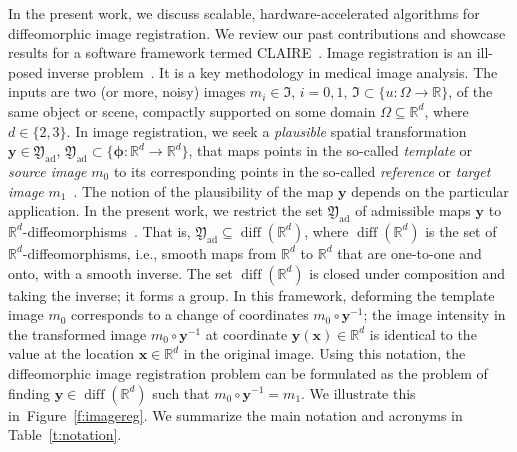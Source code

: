 \documentclass[11pt]{amsart}
\newcommand{\figref}[1]{Figure~\ref{#1}}
\newcommand{\tabref}[1]{Table~\ref{#1}}
\newcommand\fs[1]{\ensuremath{\mathfrak{#1}}}
\renewcommand{\vec}[1]{\ensuremath{\boldsymbol{#1}}}
\begin{document}
In the present work, we discuss scalable, hardware-accelerated algorithms for diffeomorphic image registration. We review our past contributions and showcase results for a software framework termed CLAIRE~\cite{Mang:2019a,claireweb,Brunn:2021b}. Image registration is an ill-posed inverse problem~\cite{Fischer:2008a}. It is a key methodology in medical image analysis. The inputs are two (or more, noisy) images $m_i \in \fs{I}$, $i = 0,1$, $\fs{I} \subset \{u : \Omega \to \mathbb{R}\}$, of the same object or scene, compactly supported on some domain $\Omega \subseteq \mathbb{R}^d$, where $d \in \{2,3\}$. In image registration, we seek a \emph{plausible} spatial transformation $\vec{y} \in \fs{Y}_{\text{ad}}$, $\fs{Y}_{\text{ad}} \subset \{\vec{\phi} : \mathbb{R}^d \to \mathbb{R}^d\}$, that maps points in the so-called \emph{template} or \emph{source image} $m_0$ to its corresponding points in the so-called \emph{reference} or \emph{target image} $m_1$~\cite{Modersitzki:2004a,Modersitzki:2009a,Fischer:2008a}. The notion of the plausibility of the map $\vec{y}$ depends on the particular application. In the present work, we restrict the set $\fs{Y}_{\text{ad}}$ of admissible maps $\vec{y}$ to $\mathbb{R}^d$-diffeomorphisms~\cite{Younes:2019a}. That is, $\fs{Y}_{\text{ad}} \subseteq \operatorname{diff}(\mathbb{R}^d)$, where $\operatorname{diff}(\mathbb{R}^d)$ is the  set of $\mathbb{R}^d$-diffeomorphisms, i.e., smooth maps from $\mathbb{R}^d$ to $\mathbb{R}^d$ that are one-to-one and onto, with a smooth inverse. The set $\operatorname{diff}(\mathbb{R}^d)$ is closed under composition and taking the inverse; it forms a group. In this framework, deforming the template image $m_0$ corresponds to a change of coordinates $m_0 \circ \vec{y}^{-1}$; the image intensity in the transformed image $m_0 \circ \vec{y}^{-1}$ at coordinate $\vec{y}(\vec{x})\in\mathbb{R}^d$ is identical to the value at the location $\vec{x}\in\mathbb{R}^d$ in the original image. Using this notation, the diffeomorphic image registration problem can be formulated as the problem of finding $\vec{y} \in \operatorname{diff}(\mathbb{R}^d)$ such that $m_0 \circ \vec{y}^{-1} = m_1$. We illustrate this in~\figref{f:imagereg}. We summarize the main notation and acronyms in \tabref{t:notation}.
\end{document}
